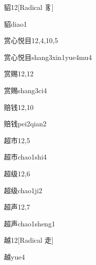 \begin{entry}{貂}{12}[Radical 豸]
  \begin{phonetics}{貂}{diao1}
  \end{phonetics}
\end{entry}

\begin{entry}{赏心悦目}{12,4,10,5}
  \begin{phonetics}{赏心悦目}{shang3xin1yue4mu4}
  \end{phonetics}
\end{entry}

\begin{entry}{赏赐}{12,12}
  \begin{phonetics}{赏赐}{shang3ci4}
  \end{phonetics}
\end{entry}

\begin{entry}{赔钱}{12,10}
  \begin{phonetics}{赔钱}{pei2qian2}
  \end{phonetics}
\end{entry}

\begin{entry}{超市}{12,5}
  \begin{phonetics}{超市}{chao1shi4}
  \end{phonetics}
\end{entry}

\begin{entry}{超级}{12,6}
  \begin{phonetics}{超级}{chao1ji2}
  \end{phonetics}
\end{entry}

\begin{entry}{超声}{12,7}
  \begin{phonetics}{超声}{chao1sheng1}
  \end{phonetics}
\end{entry}

\begin{entry}{越}{12}[Radical 走]
  \begin{phonetics}{越}{yue4}
  \end{phonetics}
\end{entry}

